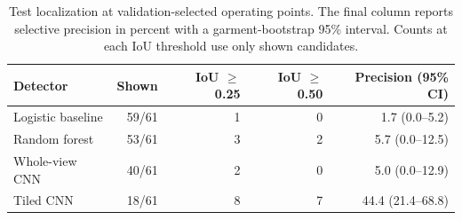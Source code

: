 \begin{table}[htbp]
  \centering
  \caption{Test localization at validation-selected operating points. The final column reports selective precision in percent with a garment-bootstrap 95\% interval. Counts at each IoU threshold use only shown candidates.}
  \begin{tabular}{lrrrr}
    \toprule
    Detector & Shown & IoU $\geq$ 0.25 & IoU $\geq$ 0.50 & Precision (95\% CI) \\
    \midrule
Logistic baseline & 59/61 & 1 & 0 & 1.7 (0.0--5.2) \\
Random forest & 53/61 & 3 & 2 & 5.7 (0.0--12.5) \\
Whole-view CNN & 40/61 & 2 & 0 & 5.0 (0.0--12.9) \\
Tiled CNN & 18/61 & 8 & 7 & 44.4 (21.4--68.8) \\
    \bottomrule
  \end{tabular}
  \label{tab:results}
\end{table}

